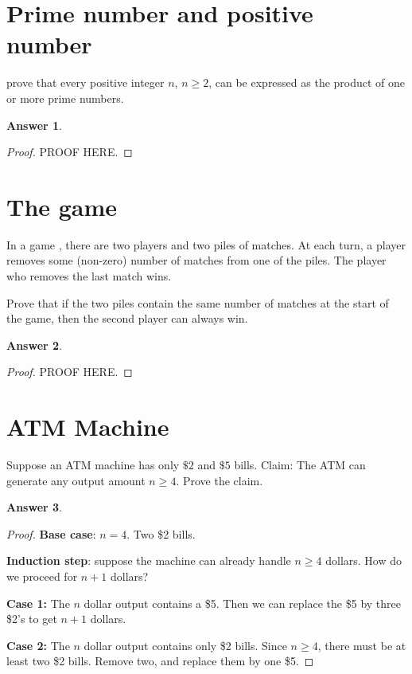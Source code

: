 \documentclass[a4paper]{article}
\renewcommand{\(}{\left(}
\renewcommand{\)}{\right)}
\theoremstyle{plain}
\theoremstyle{plain}
\theoremstyle{definition}
\newtheorem*{answer}{Answer}
\begin{document}
\section{Prime number and positive number}
prove that every positive integer $n$, $n \geq 2$, can be expressed as the product of one or more prime numbers.
\begin{shaded}
\begin{answer}
\begin{proof}
PROOF HERE.
\end{proof}
\end{answer}
\end{shaded}

\section{The game}
In a game , there are two players and two piles of matches. At each turn, a player removes some (non-zero) number of matches from one of the piles. The player who removes the last match wins.

Prove that if the two piles contain the same number of matches at the start of the game, then the second player can always win.

\begin{shaded}
\begin{answer}
\begin{proof}
PROOF HERE.
\end{proof}
\end{answer}
\end{shaded}

\section{ATM Machine}
Suppose an ATM machine has only $\$2$ and $\$5$ bills.
Claim: The ATM can generate any output amount $n \geq 4$.
Prove the claim.
\begin{shaded}
\begin{answer}
\begin{proof}
\textbf{Base case}: $n = 4$. Two \$2 bills.

\textbf{Induction step}: suppose the machine can already handle $n \geq 4$ dollars.
How do we proceed for $n+1$ dollars?

\textbf{Case 1: }  The $n$ dollar output contains a \$5. Then we can replace the \$5 by three \$2's to get $ n+1$ dollars.
 
 \textbf{Case 2: } The $n$ dollar output contains only \$2 bills. Since $n \geq 4$, there must be at least two \$2 bills. Remove two, and replace them by one \$5.

\end{proof}
\end{answer}
\end{shaded}
\end{document}
